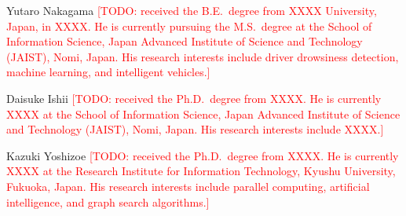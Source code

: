 \documentclass[lettersize,journal]{IEEEtran}
\newcommand{\todo}[1]{\textcolor{red}{[TODO: #1]}}
\begin{document}
\begin{IEEEbiographynophoto}{Yutaro Nakagama}
\todo{received the B.E.\ degree from XXXX University, Japan, in XXXX. He is currently pursuing the M.S.\ degree at the School of Information Science, Japan Advanced Institute of Science and Technology (JAIST), Nomi, Japan. His research interests include driver drowsiness detection, machine learning, and intelligent vehicles.}
\end{IEEEbiographynophoto}

\begin{IEEEbiographynophoto}{Daisuke Ishii}
\todo{received the Ph.D.\ degree from XXXX. He is currently XXXX at the School of Information Science, Japan Advanced Institute of Science and Technology (JAIST), Nomi, Japan. His research interests include XXXX.}
\end{IEEEbiographynophoto}

\begin{IEEEbiographynophoto}{Kazuki Yoshizoe}
\todo{received the Ph.D.\ degree from XXXX. He is currently XXXX at the Research Institute for Information Technology, Kyushu University, Fukuoka, Japan. His research interests include parallel computing, artificial intelligence, and graph search algorithms.}
\end{IEEEbiographynophoto}

\vfill
\end{document}
